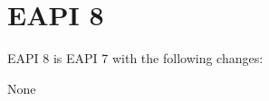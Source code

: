 \section{EAPI 8}

EAPI 8 is EAPI 7 with the following changes:

\begin{compactitem}
\item None
\end{compactitem}



